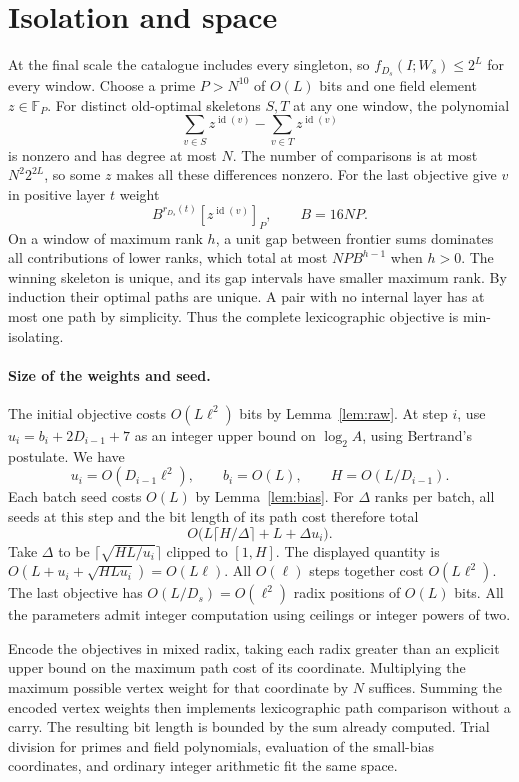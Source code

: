\documentclass[11pt]{article}
\newcommand{\F}{\mathbb F}
\newcommand{\id}{\operatorname{id}}
\begin{document}
\section{Isolation and space}

At the final scale the catalogue includes every singleton, so
$f_{D_s}(I;W_s)\le2^L$ for every window. Choose a prime $P>N^{10}$
of $O(L)$ bits and one field element $z\in\F_P$. For distinct old-optimal
skeletons $S,T$ at any one window, the polynomial
\[
           \sum_{v\in S}z^{\id(v)}-\sum_{v\in T}z^{\id(v)}
\]
is nonzero and has degree at most $N$. The number of comparisons is at
most $N^2 2^{2L}$, so some $z$ makes all these differences nonzero.
For the last objective give $v$ in positive layer $t$ weight
\[
                   B^{r_{D_s}(t)}[z^{\id(v)}]_P ,
                    \qquad B=16NP .
\]
On a window of maximum rank $h$, a unit gap between frontier sums
dominates all contributions of lower ranks, which total at most
$NP B^{h-1}$ when $h>0$. The winning skeleton is unique, and its
gap intervals have smaller maximum rank. By induction their optimal paths
are unique. A pair with no internal layer has at most one path by
simplicity. Thus the complete lexicographic objective is min-isolating.

\paragraph{Size of the weights and seed.}
The initial objective costs $O(L\ell^2)$ bits by Lemma~\ref{lem:raw}.
At step $i$, use $u_i=b_i+2D_{i-1}+7$ as an integer upper bound on
$\log_2 A$, using Bertrand's postulate. We have
\[
 u_i=O(D_{i-1}\ell^2),\qquad b_i=O(L),\qquad
 H=O(L/D_{i-1}).
\]
Each batch seed costs $O(L)$ by Lemma~\ref{lem:bias}. For $\Delta$ ranks
per batch, all seeds at this step and the bit length of its path cost
therefore total
\[
             O\bigl(L\lceil H/\Delta\rceil+L+\Delta u_i\bigr).
\]
Take $\Delta$ to be $\lceil\sqrt{HL/u_i}\rceil$ clipped to $[1,H]$.
The displayed quantity is $O(L+u_i+\sqrt{H L u_i})=O(L\ell)$.
All $O(\ell)$ steps together cost $O(L\ell^2)$. The last objective
has $O(L/D_s)=O(\ell^2)$ radix positions of $O(L)$ bits. All the parameters
admit integer computation using ceilings or integer powers of two.

Encode the objectives in mixed radix, taking each radix greater than
an explicit upper bound on the maximum path cost of its coordinate.
Multiplying the maximum possible vertex weight for that coordinate by
$N$ suffices. Summing the encoded vertex weights then implements
lexicographic path comparison without a carry. The resulting bit length
is bounded by the sum already computed. Trial division for primes and
field polynomials, evaluation of the small-bias coordinates, and
ordinary integer arithmetic fit the same space.
\end{document}
